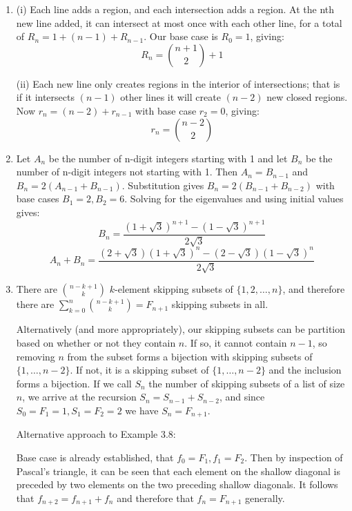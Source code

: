 \documentclass{book}
\numberwithin{equation}{section}
\begin{document}
\begin{enumerate}[label={5.\arabic*}]

\item
(i) Each line adds a region, and each intersection adds a region. At the nth new line added, it can intersect at
most once with each other line, for a total of $R_n = 1 + (n-1) + R_{n-1}$. Our base case is $R_0 = 1$, giving:
$$R_n = {n+1 \choose 2} + 1$$

(ii) Each new line only creates regions in the interior of intersections; that is if it intersects $(n-1)$ other lines
it will create $(n-2)$ new closed regions. Now $r_n = (n-2) + r_{n-1}$ with base case $r_2 = 0$, giving:
$$r_n = {n-2 \choose 2}$$

\item
Let $A_n$ be the number of n-digit integers starting with 1 and let $B_n$ be the number of n-digit integers
not starting with 1. Then $A_n = B_{n-1}$ and $B_n = 2(A_{n-1} + B_{n-1})$. Substitution gives
$B_n = 2(B_{n-1} + B_{n-2})$ with base cases $B_1 = 2, B_2 = 6$. Solving for the eigenvalues and using initial
values gives:
$$B_n = \frac{(1+\sqrt3)^{n+1} - (1 - \sqrt3)^{n+1}}{2\sqrt3}$$
$$A_n + B_n = \frac{(2+\sqrt3)(1+\sqrt3)^n - (2 - \sqrt3)(1 - \sqrt3)^n}{2\sqrt3}$$

\item
There are ${n-k+1 \choose k}$ $k$-element skipping subsets of $\{ 1, 2, \ldots, n\}$, and therefore there are
$\sum_{k=0}^{n} {n-k+1 \choose k} = F_{n+1}$ skipping subsets in all.

Alternatively (and more appropriately), our skipping subsets can be partition based on whether or not 
they contain $n$. If so, it cannot contain $n-1$, so removing $n$ from the subset forms a bijection with
skipping subsets of $\{1, \ldots, n-2\}$. If not, it is a skipping subset of $\{1, \ldots, n-2\}$ and the inclusion
forms a bijection. If we call $S_n$ the number of skipping subsets of a list of size $n$, we arrive at the
recursion $S_n = S_{n-1} + S_{n-2}$, and since $S_0 = F_1 = 1, S_1 = F_2 = 2$ we have $S_n = F_{n+1}$.

Alternative approach to Example 3.8:

Base case is already established, that $f_0 = F_1, f_1 = F_2$. Then by inspection of Pascal's triangle, it can
be seen that each element on the shallow diagonal is preceded by two elements on the two preceding
shallow diagonals. It follows that $f_{n+2} = f_{n+1} + f_n$ and therefore that $f_n = F_{n+1}$ generally.


\end{enumerate}
\end{document}
